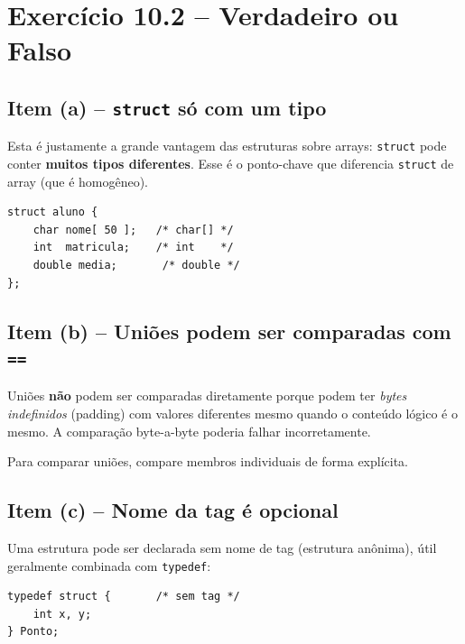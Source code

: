 \documentclass[12pt,a4paper]{article}
\begin{document}
\newpage

\section{Exercício 10.2 -- Verdadeiro ou Falso}

\subsection*{Item (a) -- \texttt{struct} só com um tipo}
\begin{tcolorbox}[colback=red!5,colframe=deitelred,title={\bfseries FALSO}]
Esta é justamente a grande vantagem das estruturas sobre arrays: \texttt{struct}
pode conter \textbf{muitos tipos diferentes}. Esse é o ponto-chave que diferencia
\texttt{struct} de array (que é homogêneo).

\begin{lstlisting}
struct aluno {
    char nome[ 50 ];   /* char[] */
    int  matricula;    /* int    */
    double media;       /* double */
};
\end{lstlisting}
\end{tcolorbox}

\subsection*{Item (b) -- Uniões podem ser comparadas com \texttt{==}}
\begin{tcolorbox}[colback=red!5,colframe=deitelred,title={\bfseries FALSO}]
Uniões \textbf{não} podem ser comparadas diretamente porque podem ter
\textit{bytes indefinidos} (padding) com valores diferentes mesmo quando o
conteúdo lógico é o mesmo. A comparação byte-a-byte poderia falhar incorretamente.

Para comparar uniões, compare membros individuais de forma explícita.
\end{tcolorbox}

\subsection*{Item (c) -- Nome da tag é opcional}
\begin{tcolorbox}[colback=green!5,colframe=deitelgreen,title={\bfseries VERDADEIRO}]
Uma estrutura pode ser declarada sem nome de tag (estrutura anônima), útil
geralmente combinada com \texttt{typedef}:
\begin{lstlisting}
typedef struct {       /* sem tag */
    int x, y;
} Ponto;
\end{lstlisting}
\end{tcolorbox}
\end{document}
